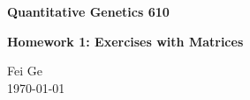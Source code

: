 \documentclass{article}
\begin{document}
\begin{center}
    {\Large \bf Quantitative Genetics 610} %
    \vspace{1em} %
    
    {\large \bf Homework 1: Exercises with Matrices} %
    \vspace{2em} %
    
    Fei Ge \\ %
    \today %
\end{center}

\vspace{1em} %
\end{document}
